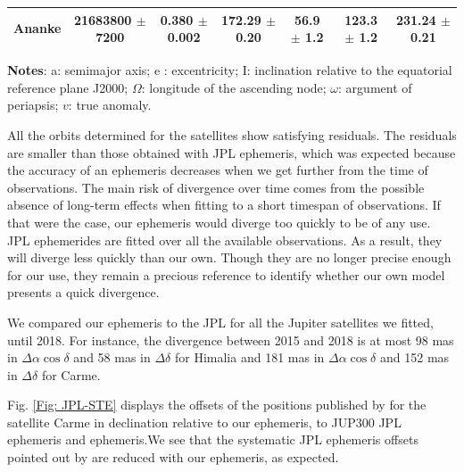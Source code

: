 \documentclass[useAMS,usenatbib]{mn2e}
\begin{document}
\begin{table}
\begin{center}
\begin{tabular}{ccccccc}
Ananke &  21683800  $\pm$ 7200  &     0.380 $\pm$ 0.002      &   172.29 $\pm$ 0.20      &   56.9 $\pm$ 1.2      &   123.3 $\pm$ 1.2      &   231.24 $\pm$ 0.21  \\
\hline
\end{tabular} 
\end{center}
\begin{flushleft}
\textbf{Notes}: a: semimajor axis; e : excentricity; I: inclination relative to the equatorial reference plane J2000; $\Omega$: longitude of the ascending node; $\omega$: argument of periapsis; $v$: true anomaly.
\end{flushleft}
\end{table}

All the orbits determined for the satellites show satisfying residuals. The residuals are smaller than those obtained with JPL ephemeris, which was expected because the accuracy of an ephemeris decreases when we get further from the time of observations. The main risk of divergence over time comes from the possible absence of long-term effects when fitting to a short timespan of observations. If that were the case, our ephemeris would diverge too quickly to be of any use. JPL ephemerides are fitted over all the available observations. As a result, they will diverge less quickly than our own. Though they are no longer precise enough for our use, they remain a precious reference to identify whether our own model presents a quick divergence.

We compared our ephemeris to the JPL for all the Jupiter satellites we fitted, until 2018. For instance, the divergence between 2015 and 2018 is at most 98 mas in $\Delta \alpha \cos \delta$ and 58 mas in $\Delta \delta$ for Himalia and 181 mas in $\Delta \alpha \cos \delta$ and 152 mas in $\Delta \delta$ for Carme.

Fig. \ref{Fig: JPL-STE} displays the offsets of the positions published by \cite{GomesJunior2015} for the satellite Carme in declination relative to our ephemeris, to \cite{Jacobson2012} JUP300 JPL ephemeris and \cite{Emelyanov2008} ephemeris.We see that the systematic JPL ephemeris offsets pointed out by \cite{GomesJunior2015} are reduced with our ephemeris, as expected.
\end{document}
